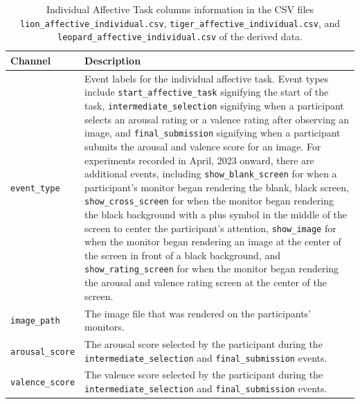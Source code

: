 \begin{table}[h]
\centering
\begin{tabularx}{\textwidth}{|l|X|}
\hline
\textbf{Channel} & \textbf{Description} \\
\hline
\texttt{event\_type} & Event labels for the individual affective task. Event types include \texttt{start\_affective\_task} signifying the start of the task, \texttt{intermediate\_selection} signifying when a participant selects an arousal rating or a valence rating after observing an image, and \texttt{final\_submission} signifying when a participant submits the arousal and valence score for an image. For experiments recorded in April, 2023 onward, there are additional events, including \texttt{show\_blank\_screen} for when a participant's monitor began rendering the blank, black screen, \texttt{show\_cross\_screen} for when the monitor began rendering the black background with a plus symbol in the middle of the screen to center the participant's attention, \texttt{show\_image} for when the monitor began rendering an image at the center of the screen in front of a black background, and \texttt{show\_rating\_screen} for when the monitor began rendering the arousal and valence rating screen at the center of the screen.\\
\hline
\texttt{image\_path} & The image file that was rendered on the participants' monitors.\\
\hline
\texttt{arousal\_score} & The arousal score selected by the participant during the \texttt{intermediate\_selection} and \texttt{final\_submission} events.\\
\hline
\texttt{valence\_score} & The valence score selected by the participant during the \texttt{intermediate\_selection} and \texttt{final\_submission} events.\\
\hline
\end{tabularx}
\caption{Individual Affective Task columns information in the CSV files \texttt{lion\_affective\_individual.csv}, \texttt{tiger\_affective\_individual.csv}, and \texttt{leopard\_affective\_individual.csv} of the derived data.}
\label{tab:individual_affective_task_columns}
\end{table}


